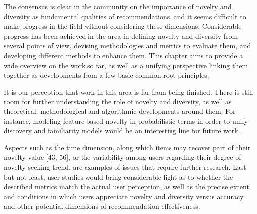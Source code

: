 The consensus is clear in the community on the importance of novelty and diversity as fundamental qualities of recommendations, and it seems difficult to make progress in the field without considering these dimensions. Considerable progress has been achieved in the area in defining novelty and diversity from several points of view, devising methodologies and metrics to evaluate them, and developing different methods to enhance them. This chapter aims to provide a wide overview on the work so far, as well as a unifying perspective linking them together as developments from a few basic common root principles.

It is our perception that work in this area is far from being finished. There is still room for further understanding the role of novelty and diversity, as well as theoretical, methodological and algorithmic developments around them. For instance, modeling feature-based novelty in probabilistic terms in order to unify discovery and familiarity models would be an interesting line for future work.

Aspects such as the time dimension, along which items may recover part of their novelty value [43, 56], or the variability among users regarding their degree of novelty-seeking trend, are examples of issues that require further research. Last but not least, user studies would bring considerable light as to whether the described metrics match the actual user perception, as well as the precise extent and conditions in which users appreciate novelty and diversity versus accuracy and other potential dimensions of recommendation effectiveness.

